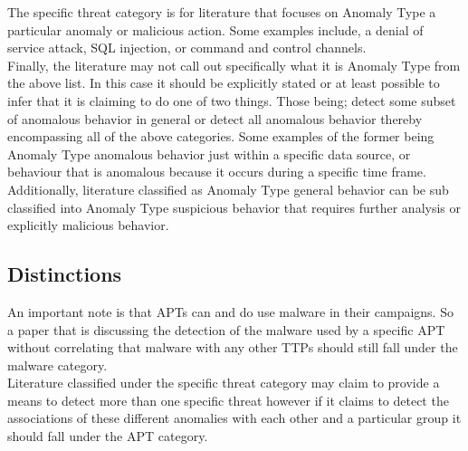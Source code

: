 \documentclass[10pt]{IEEEtran}
\begin{document}
The specific threat category is for literature that focuses on Anomaly Type a particular anomaly or malicious action. Some examples include, a denial of service attack, SQL injection, or command and control channels. \\
Finally, the literature may not call out specifically what it is Anomaly Type from the above list. In this case it should be explicitly stated or at least possible to infer that it is claiming to do one of two things. Those being; detect some subset of anomalous behavior in general or detect all anomalous behavior thereby encompassing all of the above categories. Some examples of the former being Anomaly Type anomalous behavior just within a specific data source, or behaviour that is anomalous because it occurs during a specific time frame. Additionally, literature classified as Anomaly Type general behavior can be sub classified into Anomaly Type suspicious behavior that requires further analysis or explicitly malicious behavior.

\subsection{Distinctions}
An important note is that APTs can and do use malware in their campaigns. So a paper that is discussing the detection of the malware used by a specific APT without correlating that malware with any other TTPs should still fall under the malware category.\\
Literature classified under the specific threat category may claim to provide a means to detect more than one specific threat however if it claims to detect the associations of these different anomalies with each other and a particular group it should fall under the APT category.
\end{document}
